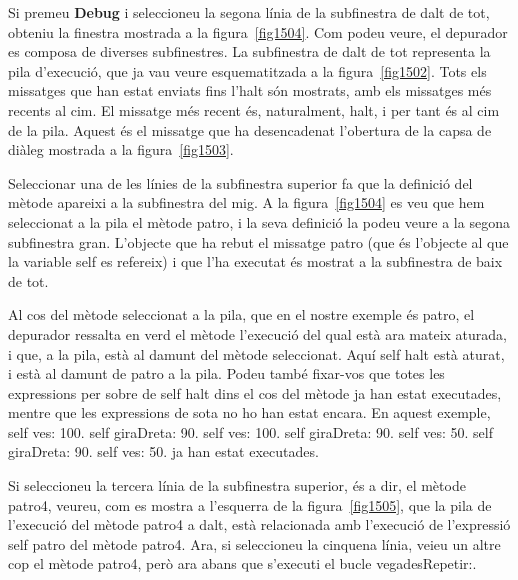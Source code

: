 Si premeu \textbf{Debug} i seleccioneu la segona línia de la subfinestra de dalt de tot, obteniu la finestra mostrada a la figura~\ref{fig1504}. Com podeu veure, el depurador es composa de diverses subfinestres. La subfinestra de dalt de tot representa la pila d'execució, que ja vau veure esquematitzada a la figura~\ref{fig1502}. Tots els missatges que han estat enviats fins l'\textsf{halt} són mostrats, amb els missatges més recents al cim. El missatge més recent és, naturalment, \textsf{halt}, i per tant és al cim de la pila. Aquest és el missatge que ha desencadenat l'obertura de la capsa de diàleg mostrada a la figura~\ref{fig1503}.

Seleccionar una de les línies de la subfinestra superior fa que la definició del mètode apareixi a la subfinestra del mig. A  la figura~\ref{fig1504} es veu que hem seleccionat a la pila el mètode \textsf{patro}, i la seva definició la podeu veure a la segona subfinestra gran. L'objecte que ha rebut el missatge \textsf{patro} (que és l'objecte al que la variable \textsf{self} es refereix) i que l'ha executat és mostrat a la subfinestra de baix de tot.

Al cos del mètode seleccionat a la pila, que en el nostre exemple és \textsf{patro}, el depurador ressalta en verd el mètode l'execució del qual està ara mateix aturada, i que, a la pila, està al damunt del mètode seleccionat. Aquí \textsf{self halt} està aturat, i està al damunt de \textsf{patro} a la pila. Podeu també fixar-vos que totes les expressions per sobre de \textsf{self halt} dins el cos del mètode ja han estat executades, mentre que les expressions de sota no ho han estat encara. En aquest exemple, 
\textsf{self ves: 100. self giraDreta: 90. self ves: 100. self giraDreta: 90. self ves: 50. self giraDreta: 90. self ves: 50.}
ja han estat executades.

Si seleccioneu la tercera línia de la subfinestra superior, és a dir, el mètode \textsf{patro4}, veureu, com es mostra a l'esquerra de la figura~\ref{fig1505}, que la pila de l'execució del mètode \textsf{patro4} a dalt, està relacionada amb l'execució de l'expressió \textsf{self patro} del mètode \textsf{patro4}. Ara, si seleccioneu la cinquena línia, veieu un altre cop el mètode \textsf{patro4}, però ara abans que s'executi el bucle \textsf{vegadesRepetir:}. 

